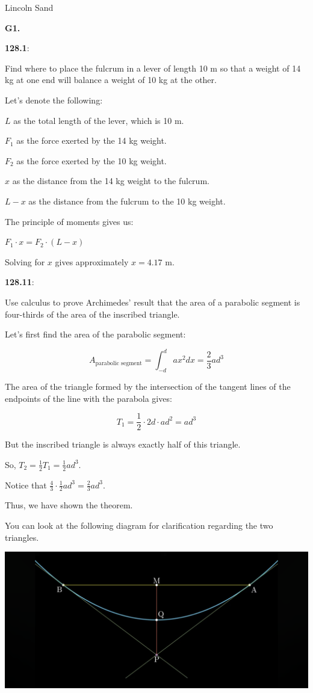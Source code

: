 \documentclass{article}
\begin{document}
\Large{Lincoln Sand}


\textbf{G1.}

\textbf{128.1}:

Find where to place the fulcrum in a lever of length 10 m so that a weight of
14 kg at one end will balance a weight of 10 kg at the other.

Let's denote the following:

$L$ as the total length of the lever, which is 10 m.

$F_1$ as the force exerted by the 14 kg weight.

$F_2$ as the force exerted by the 10 kg weight.

$x$ as the distance from the 14 kg weight to the fulcrum.

$L - x$ as the distance from the fulcrum to the 10 kg weight.

The principle of moments gives us:

$F_1 \cdot x = F_2 \cdot (L - x)$

Solving for $x$ gives approximately $x = 4.17$ m.


\textbf{128.11}:

Use calculus to prove Archimedes' result that the area of a parabolic segment
is four-thirds of the area of the inscribed triangle.

Let's first find the area of the parabolic segment:

\[A_{\text{parabolic segment}} = \int_{-d}^{d} a x^2 dx = \frac{2}{3} a d^3\]

The area of the triangle formed by the intersection of the tangent lines of the endpoints
of the line with the parabola gives:

\[T_1 = \frac{1}{2} \cdot 2 d \cdot a d^2 = a d^3\]

But the inscribed triangle is always exactly half of this triangle.

So, $T_2 = \frac{1}{2} T_1 = \frac{1}{2} a d^3$.

Notice that $\frac{4}{3} \cdot \frac{1}{2} a d^3 = \frac{2}{3} a d^3$.

Thus, we have shown the theorem.

You can look at the following diagram for clarification regarding the two triangles.

\includegraphics[width=\linewidth]{quadrature_parabola}
\end{document}
